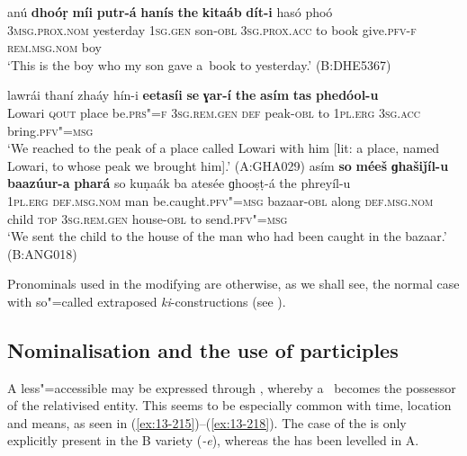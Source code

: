 \ea
\label{ex:13-212}
\gll anú \textbf{dhoóṛ} \textbf{míi} \textbf{putr-á} \textbf{hanís} \textbf{the} \textbf{kitaáb} \textbf{dít-i} hasó phoó\\
\textsc{3msg.prox.nom} yesterday \textsc{1sg.gen} son-\textsc{obl} \textsc{3sg.prox.acc} to  book give.\textsc{pfv-f} \textsc{rem.msg.nom} boy \\
\glt `This is the boy who my son gave a~book to yesterday.' (B:DHE5367)

\ex
\label{ex:13-213}
\gll lawrái thaní zhaáy hín-i    \textbf{eetasíi} \textbf{se} \textbf{ɣar-í} \textbf{the} \textbf{asím} \textbf{tas} \textbf{    phedóol-u}\\
Lowari \textsc{qout} place be.\textsc{prs"=f} \textsc{3sg.rem.gen} \textsc{def} peak-\textsc{obl} to \textsc{1pl.erg} \textsc{3sg.acc} bring.\textsc{pfv"=msg}\\
\glt `We reached to the peak of a place called Lowari with him [lit: a place, named Lowari, to whose peak we brought him].' (A:GHA029)
\ex
\label{ex:13-214}
\gll asím \textbf{so} \textbf{méeš} \textbf{ɡhašiǰíl-u} \textbf{baazúur-a} \textbf{phará} so kuṇaák ba atesée ɡhooṣṭ-á the phreyíl-u\\
\textsc{1pl.erg} \textsc{def.msg.nom} man be.caught.\textsc{pfv"=msg} bazaar-\textsc{obl} along \textsc{def.msg.nom} child \textsc{top} \textsc{3sg.rem.gen} house-\textsc{obl} to send.\textsc{pfv"=msg}\\
\glt `We sent the child to the house of the man who had been caught in the bazaar.' (B:ANG018) 
\z

Pronominals used in the modifying  are otherwise, as we shall see, the normal case with so"=called extraposed \textit{ki}-constructions (see ). 


\subsection{Nominalisation and the use of participles}
\label{subsec:13-6-6}

A less"=accessible   may be expressed through , whereby a~ becomes the possessor of the relativised entity. This seems to be especially common with time, location and means, as seen in (\ref{ex:13-215})--(\ref{ex:13-218}). The  case of the  is only explicitly present in the B variety (\textit{-e}), whereas the  has been levelled in A.


